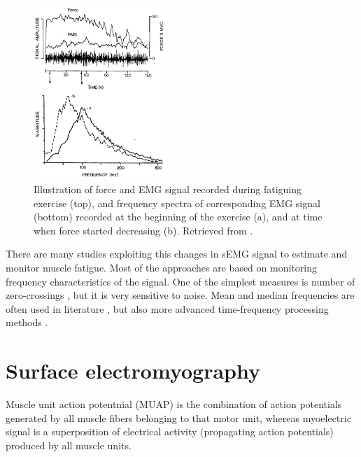 \begin{figure}[ht]
\centering
\includegraphics[width=0.45\textwidth]{Images/introduction/fatigue.png}
\caption{Illustration of force and EMG signal recorded during fatiguing exercise (top), and frequency spectra of corresponding EMG signal (bottom) recorded at the beginning of the exercise (a), and at time when force started decreasing (b). Retrieved from \citep{DeLuca1984}.}
\label{fig:fatigue}
\end{figure}

There are many studies exploiting this changes in sEMG signal to estimate and monitor muscle fatigue. Most of the approaches are based on monitoring frequency characteristics of the signal. One of the simplest measures is number of zero-crossings \citep{Hagg1981}, but it is very sensitive to noise. Mean and median frequencies are often used in literature \citep{Lindstrom1977, Merletti1997, Stulen1981}, but also more advanced time-frequency processing methods \citep{Knaflitz1999, Cifrek2000, Georgakis2003, Srhoj-Egekher2011a}.


\section{Surface electromyography}

Muscle unit action potentnial (MUAP) is the combination of action potentials generated by all muscle fibers belonging to that motor unit, whereas myoelectric signal is a superposition of electrical activity (propagating action potentials) produced by all muscle units. 

